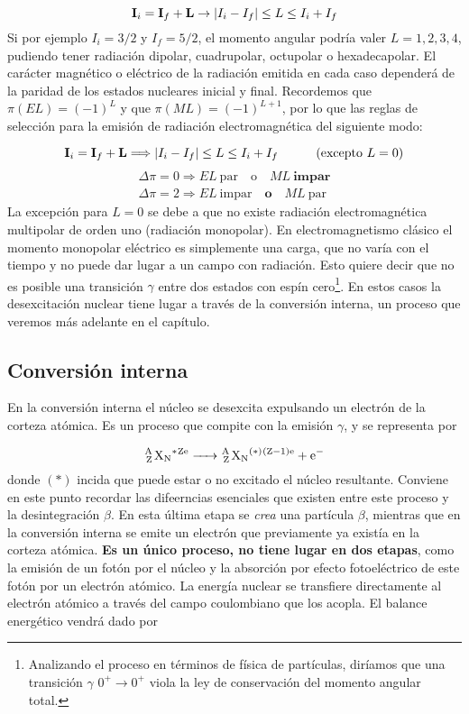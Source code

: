 \begin{equation}
	\mathbf{I}_i = \mathbf{I}_f + \mathbf{L}  \rightarrow |I_i -I_f|\leq L\leq I_i + I_f
\end{equation}
Si por ejemplo $I_i=3/2$ y $I_f=5/2$, el momento angular podría valer $L=1,2,3,4$, pudiendo tener radiación dipolar, cuadrupolar, octupolar o hexadecapolar. El carácter magnético o eléctrico de la radiación emitida en cada caso dependerá de la paridad de los estados nucleares inicial y final. Recordemos que $\pi(EL)=(-1)^L$ y que $\pi(ML)=(-1)^{L+1}$, por lo que las reglas de selección para la emisión de radiación electromagnética del siguiente modo:

\begin{equation}
	\mathbf{I}_i = \mathbf{I}_f + \mathbf{L} \Longrightarrow |I_i -I_f|\leq L\leq I_i + I_f \quad \quad \quad (\text{excepto} \ L=0)
\end{equation}
\begin{eqnarray*}
 	\Delta \pi = 0 \Longrightarrow EL \ \text{par} \quad \text{o} \quad M L  \ \textbf{impar} \\ 	
 	\Delta \pi = 2 \Longrightarrow EL \ \text{impar} \quad \textbf{o} \quad ML \ \text{par}
\end{eqnarray*} 
La excepción para $L=0$ se debe a que no existe radiación electromagnética multipolar de orden uno (radiación monopolar). En electromagnetismo clásico el momento monopolar eléctrico es simplemente una carga, que no varía con el tiempo y no puede dar lugar a un campo con radiación. Esto quiere decir que no es posible una transición $\gamma$ entre dos estados con espín cero\footnote{Analizando el proceso en términos de física de partículas, diríamos que una transición $\gamma$ $0^+ \rightarrow 0^+$ viola la ley de conservación del momento angular total.}. En estos casos la desexcitación nuclear tiene lugar a través de la conversión interna, un proceso que veremos más adelante en el capítulo.

\subsection{Conversión interna}

En la conversión interna el núcleo se desexcita expulsando un electrón de la corteza atómica. Es un proceso que compite con la emisión $\gamma$, y se representa por

\begin{equation}
	\ce{^A_Z X_N^*^{Ze} -> ^A_Z X_N^{(*)}^{(Z-1)e} + e^-}
\end{equation}
donde $(*)$ incida que puede estar o no excitado el núcleo resultante. Conviene en este punto recordar las difeerncias esenciales que existen entre este proceso y la desintegración $\beta$. En esta última etapa se \textit{crea} una partícula $\beta$, mientras que en la conversión interna se emite un electrón que previamente ya existía en la corteza atómica. \textbf{Es un único proceso, no tiene lugar en dos etapas}, como la emisión de un fotón por el núcleo y la absorción por efecto fotoeléctrico de este fotón por un electrón atómico. La energía nuclear se transfiere directamente al electrón atómico a través del campo coulombiano que los acopla. El balance energético vendrá dado por 

